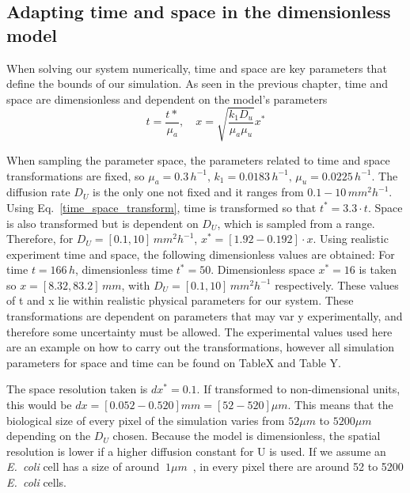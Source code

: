 \subsection{Adapting time and space in the dimensionless model}
When solving our system numerically, time and space are key parameters that define the bounds of our simulation.
As seen in the previous chapter, time and space are dimensionless and dependent on the model’s parameters
\begin{equation}\label{time_space_transform}
    t = \frac{t*}{\mu _a}, \quad x = \sqrt{\frac{k_{1}D_{u}}{\mu_{a}\mu_{u}}}x^*
\end{equation}

When sampling the parameter space, the parameters related to time and space transformations are fixed, so $\mu_a = 0.3 \,h^{-1}, \,k_1 = 0.0183 \,h^{-1},\, \mu_u = 0.0225\, h^{-1}$.
The diffusion rate $D_U$ is the only one not fixed and it ranges from $0.1-10 \,mm^2h^{-1}$.
Using Eq.~\ref{time_space_transform}, time is transformed so that $t^*=3.3\cdot t$.
Space is also transformed but is dependent on $D_U$, which is sampled from a range.
Therefore, for $D_U = [0.1, 10] \,mm^2 h^{-1}$, $x^* =[1.92 - 0.192] \cdot x$.
Using realistic experiment time and space, the following dimensionless values are obtained:
For time $t=166\,h$, dimensionless time $t^*=50$.
Dimensionless space  $x^*=16$ is taken so  $x = [8.32, 83.2] \,mm$, with $D_U = [0.1, 10]\, mm^2 h^{-1}$ respectively.
These values of t and x lie within realistic physical parameters for our system.
These transformations are dependent on parameters that may var  y experimentally, and therefore some uncertainty must be allowed.
The experimental values used here are an example on how to carry out the transformations, however all simulation parameters for space and time can be found on TableX and Table Y.

The space resolution taken is $dx^*=0.1$.
If transformed to non-dimensional units, this would be $dx =[0.052-0.520] mm = [52-520] \mu m$.
This means that the biological size of every pixel of the simulation varies from $52\mu m$ to $5200\mu m$ depending on the $D_{U}$ chosen.
Because the model is dimensionless, the spatial resolution is lower if a higher diffusion constant for U is used.
If we assume an \textit{E.~coli} cell has a size of around $~1\mu m$~\parencite{shiomi2009genetic}, in every pixel there are around 52 to 5200 \textit{E.~coli} cells.
